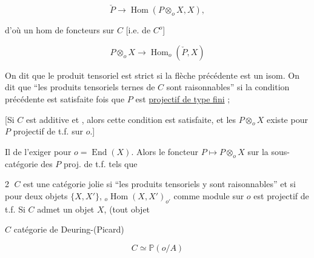 \[
\check P\longrightarrow\operatorname{Hom}(P\otimes_o X,X),
\]

d'où un hom de  foncteurs  sur $C$ [i.e. de $C^o$]

\[
P\otimes_o X\longrightarrow\operatorname{Hom}_o(\check P,X)
\]

On dit que le produit tensoriel   est
strict si la flèche précédente est un isom.
On dit que  ``les produits tensoriels ternes
de $C$ sont raisonnables'' si la condition précédente
est satisfaite  fois que $P$ est \uline{projectif
de type fini} ;


  [Si $C$ est additive et ,
alors cette condition est satisfaite, et les
$P\otimes_o X$ existe pour  $P$ projectif de t.f. sur $o$.]

Il   de l'exiger pour $o=\operatorname{End}(X)$. Alors le foncteur
$P\longmapsto P\otimes_o X$ sur la sous-catégorie des $P$ proj. de t.f. tels que

\textcircled{2} $C$ est une catégorie   jolie si
 ``les produits tensoriels y
sont raisonnables'' et si pour deux objets
$\{X,X'\}$, $ {}_o\operatorname{Hom}(X,X')_{o'}$ comme module sur
$o$  est projectif de t.f.
Si $C$ admet un  objet $X$, (tout objet


$C$ catégorie de Deuring-(Picard)

\[
C\simeq\mathbb P(o/A)
\]

